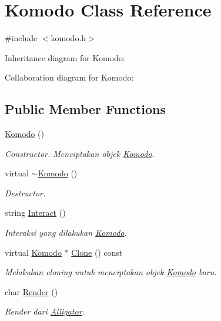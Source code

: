 \hypertarget{classKomodo}{}\section{Komodo Class Reference}
\label{classKomodo}


{\ttfamily \#include $<$komodo.\+h$>$}



Inheritance diagram for Komodo\+:


Collaboration diagram for Komodo\+:
\subsection*{Public Member Functions}
\begin{DoxyCompactItemize}
\item 
\hyperlink{classKomodo_a663a1a18bc7ac367f1a55a385604258d}{Komodo} ()
\begin{DoxyCompactList}\small\item\em Constructor. Menciptakan objek \hyperlink{classKomodo}{Komodo}. \end{DoxyCompactList}\item 
virtual \hyperlink{classKomodo_a16e327cbffe1088c1f04c397c1fbc6dd}{$\sim$\+Komodo} ()
\begin{DoxyCompactList}\small\item\em Destructor. \end{DoxyCompactList}\item 
string \hyperlink{classKomodo_a250e6b06c369a94faaa551751cd09196}{Interact} ()
\begin{DoxyCompactList}\small\item\em Interaksi yang dilakukan \hyperlink{classKomodo}{Komodo}. \end{DoxyCompactList}\item 
virtual \hyperlink{classKomodo}{Komodo} $\ast$ \hyperlink{classKomodo_aab3bd7ee8235c87e8bbafd8848968be8}{Clone} () const 
\begin{DoxyCompactList}\small\item\em Melakukan cloning untuk menciptakan objek \hyperlink{classKomodo}{Komodo} baru. \end{DoxyCompactList}\item 
char \hyperlink{classKomodo_a06ce8ed3d58a33968ecf4a12a3ebbd4d}{Render} ()
\begin{DoxyCompactList}\small\item\em Render dari \hyperlink{classAlligator}{Alligator}. \end{DoxyCompactList}\end{DoxyCompactItemize}
